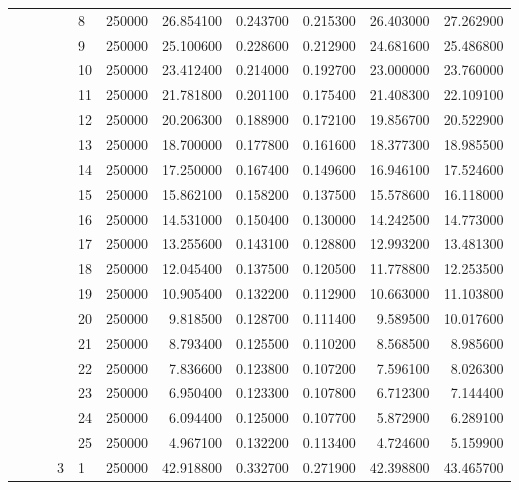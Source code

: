 \begin{tabular}{llllllrrrrr}
\cline{5-11}
 &  &  &  & 8 & 250000 & 26.854100 & 0.243700 & 0.215300 & 26.403000 & 27.262900 \\
\cline{5-11}
 &  &  &  & 9 & 250000 & 25.100600 & 0.228600 & 0.212900 & 24.681600 & 25.486800 \\
\cline{5-11}
 &  &  &  & 10 & 250000 & 23.412400 & 0.214000 & 0.192700 & 23.000000 & 23.760000 \\
\cline{5-11}
 &  &  &  & 11 & 250000 & 21.781800 & 0.201100 & 0.175400 & 21.408300 & 22.109100 \\
\cline{5-11}
 &  &  &  & 12 & 250000 & 20.206300 & 0.188900 & 0.172100 & 19.856700 & 20.522900 \\
\cline{5-11}
 &  &  &  & 13 & 250000 & 18.700000 & 0.177800 & 0.161600 & 18.377300 & 18.985500 \\
\cline{5-11}
 &  &  &  & 14 & 250000 & 17.250000 & 0.167400 & 0.149600 & 16.946100 & 17.524600 \\
\cline{5-11}
 &  &  &  & 15 & 250000 & 15.862100 & 0.158200 & 0.137500 & 15.578600 & 16.118000 \\
\cline{5-11}
 &  &  &  & 16 & 250000 & 14.531000 & 0.150400 & 0.130000 & 14.242500 & 14.773000 \\
\cline{5-11}
 &  &  &  & 17 & 250000 & 13.255600 & 0.143100 & 0.128800 & 12.993200 & 13.481300 \\
\cline{5-11}
 &  &  &  & 18 & 250000 & 12.045400 & 0.137500 & 0.120500 & 11.778800 & 12.253500 \\
\cline{5-11}
 &  &  &  & 19 & 250000 & 10.905400 & 0.132200 & 0.112900 & 10.663000 & 11.103800 \\
\cline{5-11}
 &  &  &  & 20 & 250000 & 9.818500 & 0.128700 & 0.111400 & 9.589500 & 10.017600 \\
\cline{5-11}
 &  &  &  & 21 & 250000 & 8.793400 & 0.125500 & 0.110200 & 8.568500 & 8.985600 \\
\cline{5-11}
 &  &  &  & 22 & 250000 & 7.836600 & 0.123800 & 0.107200 & 7.596100 & 8.026300 \\
\cline{5-11}
 &  &  &  & 23 & 250000 & 6.950400 & 0.123300 & 0.107800 & 6.712300 & 7.144400 \\
\cline{5-11}
 &  &  &  & 24 & 250000 & 6.094400 & 0.125000 & 0.107700 & 5.872900 & 6.289100 \\
\cline{5-11}
 &  &  &  & 25 & 250000 & 4.967100 & 0.132200 & 0.113400 & 4.724600 & 5.159900 \\
\cline{4-11} \cline{5-11}
 &  &  & \multirow[t]{25}{*}{3} & 1 & 250000 & 42.918800 & 0.332700 & 0.271900 & 42.398800 & 43.465700 \\

\end{tabular}
